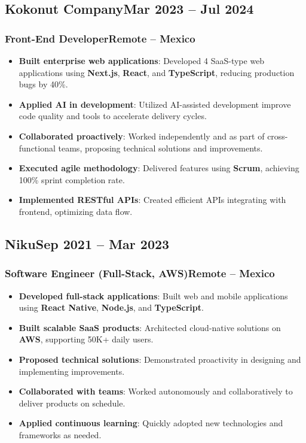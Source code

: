 \documentclass[a4paper,10pt]{article}
\newcommand{\kw}[1]{\textbf{\textcolor{keyword}{#1}}}
\newcommand{\tech}[1]{\textbf{\textcolor{tech}{#1}}}
\begin{document}
\subsection*{Kokonut Company\hfill\textbf{Mar 2023 -- Jul 2024}}
\subsubsection*{Front-End Developer\hfill Remote -- Mexico}
\begin{itemize}[noitemsep, leftmargin=*]
    \item \textbf{Built enterprise web applications}: Developed 4 SaaS-type web applications using \tech{Next.js}, \tech{React}, and \tech{TypeScript}, reducing production bugs by 40\%.
    \item \textbf{Applied AI in development}: Utilized AI-assisted development improve code quality and tools to accelerate delivery cycles.
    \item \textbf{Collaborated proactively}: Worked independently and as part of cross-functional teams, proposing technical solutions and improvements.
    \item \textbf{Executed agile methodology}: Delivered features using \kw{Scrum}, achieving 100\% sprint completion rate.
    \item \textbf{Implemented RESTful APIs}: Created efficient APIs integrating with frontend, optimizing data flow.
\end{itemize}

\subsection*{Niku\hfill\textbf{Sep 2021 -- Mar 2023}}
\subsubsection*{Software Engineer (Full-Stack, AWS)\hfill Remote -- Mexico}
\begin{itemize}[noitemsep, leftmargin=*]
    \item \textbf{Developed full-stack applications}: Built web and mobile applications using \tech{React Native}, \tech{Node.js}, and \tech{TypeScript}.
    \item \textbf{Built scalable SaaS products}: Architected cloud-native solutions on \tech{AWS}, supporting 50K+ daily users.
    \item \textbf{Proposed technical solutions}: Demonstrated proactivity in designing and implementing improvements.
    \item \textbf{Collaborated with teams}: Worked autonomously and collaboratively to deliver products on schedule.
    \item \textbf{Applied continuous learning}: Quickly adopted new technologies and frameworks as needed.
\end{itemize}
\end{document}
